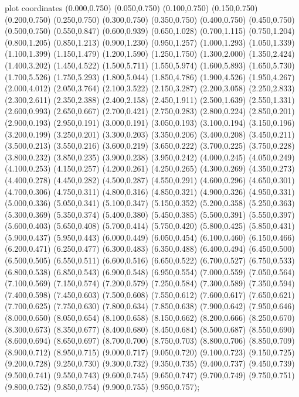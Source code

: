  plot coordinates {(0.000,0.750) (0.050,0.750) (0.100,0.750) (0.150,0.750) (0.200,0.750) (0.250,0.750) (0.300,0.750) (0.350,0.750) (0.400,0.750) (0.450,0.750) (0.500,0.750) (0.550,0.847) (0.600,0.939) (0.650,1.028) (0.700,1.115) (0.750,1.204) (0.800,1.205) (0.850,1.213) (0.900,1.230) (0.950,1.257) (1.000,1.293) (1.050,1.339) (1.100,1.399) (1.150,1.479) (1.200,1.590) (1.250,1.750) (1.300,2.000) (1.350,2.424) (1.400,3.202) (1.450,4.522) (1.500,5.711) (1.550,5.974) (1.600,5.893) (1.650,5.730) (1.700,5.526) (1.750,5.293) (1.800,5.044) (1.850,4.786) (1.900,4.526) (1.950,4.267) (2.000,4.012) (2.050,3.764) (2.100,3.522) (2.150,3.287) (2.200,3.058) (2.250,2.833) (2.300,2.611) (2.350,2.388) (2.400,2.158) (2.450,1.911) (2.500,1.639) (2.550,1.331) (2.600,0.993) (2.650,0.667) (2.700,0.421) (2.750,0.283) (2.800,0.224) (2.850,0.201) (2.900,0.193) (2.950,0.191) (3.000,0.191) (3.050,0.193) (3.100,0.194) (3.150,0.196) (3.200,0.199) (3.250,0.201) (3.300,0.203) (3.350,0.206) (3.400,0.208) (3.450,0.211) (3.500,0.213) (3.550,0.216) (3.600,0.219) (3.650,0.222) (3.700,0.225) (3.750,0.228) (3.800,0.232) (3.850,0.235) (3.900,0.238) (3.950,0.242) (4.000,0.245) (4.050,0.249) (4.100,0.253) (4.150,0.257) (4.200,0.261) (4.250,0.265) (4.300,0.269) (4.350,0.273) (4.400,0.278) (4.450,0.282) (4.500,0.287) (4.550,0.291) (4.600,0.296) (4.650,0.301) (4.700,0.306) (4.750,0.311) (4.800,0.316) (4.850,0.321) (4.900,0.326) (4.950,0.331) (5.000,0.336) (5.050,0.341) (5.100,0.347) (5.150,0.352) (5.200,0.358) (5.250,0.363) (5.300,0.369) (5.350,0.374) (5.400,0.380) (5.450,0.385) (5.500,0.391) (5.550,0.397) (5.600,0.403) (5.650,0.408) (5.700,0.414) (5.750,0.420) (5.800,0.425) (5.850,0.431) (5.900,0.437) (5.950,0.443) (6.000,0.449) (6.050,0.454) (6.100,0.460) (6.150,0.466) (6.200,0.471) (6.250,0.477) (6.300,0.483) (6.350,0.488) (6.400,0.494) (6.450,0.500) (6.500,0.505) (6.550,0.511) (6.600,0.516) (6.650,0.522) (6.700,0.527) (6.750,0.533) (6.800,0.538) (6.850,0.543) (6.900,0.548) (6.950,0.554) (7.000,0.559) (7.050,0.564) (7.100,0.569) (7.150,0.574) (7.200,0.579) (7.250,0.584) (7.300,0.589) (7.350,0.594) (7.400,0.598) (7.450,0.603) (7.500,0.608) (7.550,0.612) (7.600,0.617) (7.650,0.621) (7.700,0.625) (7.750,0.630) (7.800,0.634) (7.850,0.638) (7.900,0.642) (7.950,0.646) (8.000,0.650) (8.050,0.654) (8.100,0.658) (8.150,0.662) (8.200,0.666) (8.250,0.670) (8.300,0.673) (8.350,0.677) (8.400,0.680) (8.450,0.684) (8.500,0.687) (8.550,0.690) (8.600,0.694) (8.650,0.697) (8.700,0.700) (8.750,0.703) (8.800,0.706) (8.850,0.709) (8.900,0.712) (8.950,0.715) (9.000,0.717) (9.050,0.720) (9.100,0.723) (9.150,0.725) (9.200,0.728) (9.250,0.730) (9.300,0.732) (9.350,0.735) (9.400,0.737) (9.450,0.739) (9.500,0.741) (9.550,0.743) (9.600,0.745) (9.650,0.747) (9.700,0.749) (9.750,0.751) (9.800,0.752) (9.850,0.754) (9.900,0.755) (9.950,0.757)};
